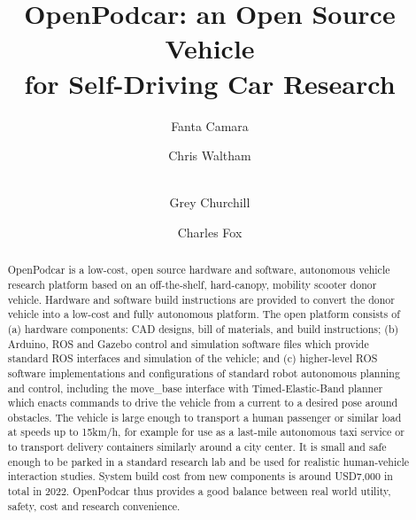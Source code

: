 \documentclass[a4paper]{article}
\title{OpenPodcar: an Open Source Vehicle \\for Self-Driving Car Research}
\author[1,2]{Fanta Camara}
\author[2]{Chris Waltham}
\author[2]{\\Grey Churchill} %
\author[1,2]{Charles Fox}
\affil[1]{Institute for Transport Studies, University of Leeds, UK}
\affil[2]{School of Computer Science, University of Lincoln, UK}
\begin{document}
	\maketitle
	
	
	\begin{abstract}
		OpenPodcar is a low-cost, open source hardware and software, autonomous vehicle research platform based on an off-the-shelf, hard-canopy, mobility scooter donor vehicle. Hardware and software build instructions are provided to convert the donor vehicle into a low-cost and fully autonomous platform. The open platform consists of (a) hardware components: CAD designs, bill of materials, and build instructions; (b) Arduino, ROS and Gazebo control and simulation software files which provide standard ROS interfaces and simulation of the vehicle; and (c) higher-level ROS software implementations and configurations of standard robot autonomous planning and control, including the move\_base interface with Timed-Elastic-Band planner which enacts commands to drive the vehicle from a current to a desired pose around obstacles. The vehicle is large enough to transport a human passenger or similar load at speeds up to 15km/h, for example for use as a last-mile autonomous taxi service or to transport delivery containers similarly around a city center. It is small and safe enough to be parked in a standard research lab and be used for realistic human-vehicle interaction studies. System build cost from new components is around USD7,000 in total in 2022. OpenPodcar thus provides a good balance between real world utility, safety, cost and research convenience.
	\end{abstract}
	
\end{document}
